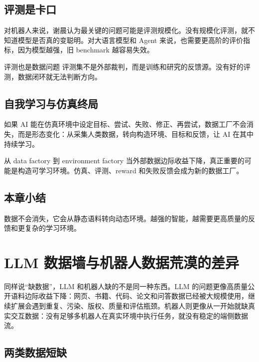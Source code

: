 \documentclass[a4paper]{article}
\begin{document}
\subsection{评测是卡口}

对机器人来说，谢晨认为最关键的问题可能是评测规模化。没有规模化评测，就不知道模型是否真的变聪明。对大语言模型和 Agent 来说，也需要更高阶的评价指标，因为模型越强，旧 benchmark 越容易失效。

\begin{importantbox}{评测也是数据问题}
评测集不是外部裁判，而是训练和研究的反馈源。没有好的评测，数据闭环就无法判断方向。
\end{importantbox}

\subsection{自我学习与仿真终局}

如果 AI 能在仿真环境中设定目标、尝试、失败、修正、再尝试，数据工厂不会消失，而是形态变化：从采集人类数据，转向构造环境、目标和反馈，让 AI 在其中持续学习。

\begin{knowledgebox}{从 data factory 到 environment factory}
当外部数据边际收益下降，真正重要的可能是构造可学习环境。仿真、评测、reward 和失败反馈会成为新的数据工厂。
\end{knowledgebox}

\subsection{本章小结}

数据不会消失，它会从静态语料转向动态环境。越强的智能，越需要更高质量的反馈和更复杂的学习环境。


\section{LLM 数据墙与机器人数据荒漠的差异}

同样说“缺数据”，LLM 和机器人缺的不是同一种东西。LLM 的问题更像高质量公开语料边际收益下降：网页、书籍、代码、论文和问答数据已经被大规模使用，继续扩展会遇到重复、污染、版权、质量和评估瓶颈。机器人则更像从一开始就缺真实交互数据：没有足够多机器人在真实环境中执行任务，就没有稳定的端侧数据流。

\subsection{两类数据短缺}
\end{document}
